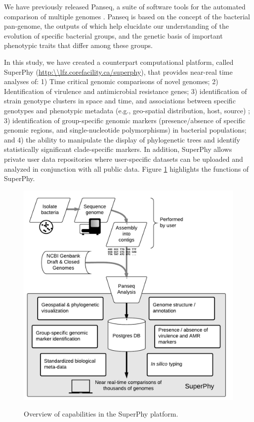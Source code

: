 \documentclass[a4paper,twoside]{article}
\begin{document}
We have previously released Panseq, a suite of software tools for the automated comparison of multiple genomes \cite{laing_pan-genome_2010,laing_identification_2011}. Panseq is based on the concept of the bacterial pan-genome, the outputs of which help elucidate our understanding of the evolution of specific bacterial groups, and the genetic basis of important phenotypic traits that differ among these groups.

In this study, we have created a counterpart computational platform, called SuperPhy (\url{http:\\lfz.corefacility.ca/superphy}), that provides near-real time analyses of: 1) Time critical genomic comparisons of novel genomes; 2) Identification of virulence and antimicrobial resistance genes; 3) identification of strain genotype clusters in space and time, and associations between specific genotypes and phenotypic metadata (e.g., geo-spatial distribution, host, source) ; 3) identification of group-specific genomic markers (presence/absence of specific genomic regions, and single-nucleotide polymorphisms) in bacterial populations; and 4) the ability to manipulate the display of phylogenetic trees and identify statistically significant clade-specific markers. In addition, SuperPhy allows private user data repositories where user-specific datasets can be uploaded and analyzed in conjunction with all public data. Figure \ref{fig:capabilities} highlights the functions of SuperPhy.

\begin{figure}[t]
  \vspace{-0.2cm}
  \centering
   {\includegraphics[width=13cm]{capabilities.pdf}}
  \caption{Overview of capabilities in the SuperPhy platform.}
  \label{fig:capabilities}
\end{figure}
\end{document}
